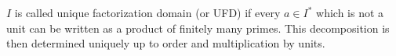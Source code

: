 $I$ is called unique factorization domain (or UFD) if every $a \in I^*$ which is not a unit can be written as a product of finitely many primes. This decomposition is then determined uniquely up to order and multiplication by units.

